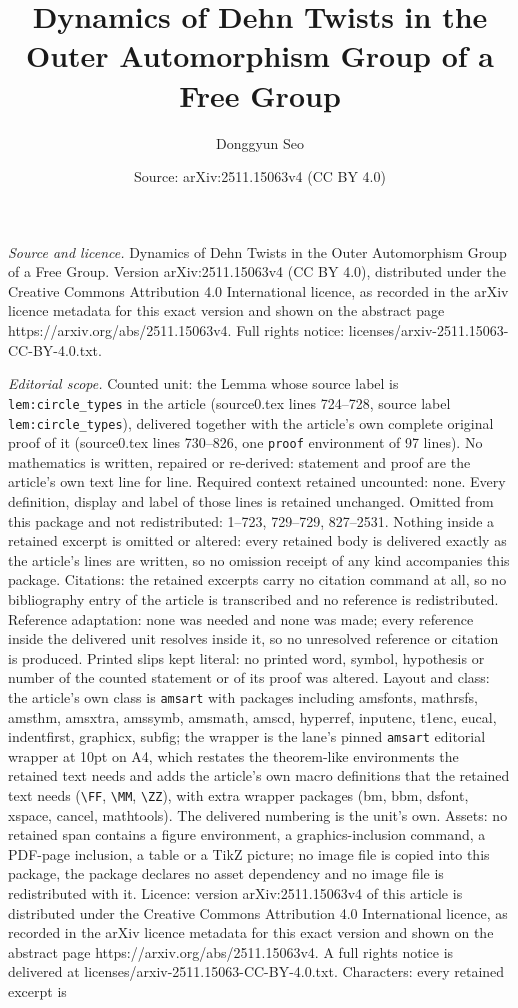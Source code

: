 \documentclass[10pt,a4paper]{amsart}
\title[Dynamics of Dehn Twists in the Outer Automorphism Group of a]{Dynamics of Dehn Twists in the Outer Automorphism Group of a Free Group}
\author{Donggyun Seo}
\date{Source: arXiv:2511.15063v4 (CC BY 4.0)}
\begin{document}
\maketitle

\noindent\emph{Source and licence.} Dynamics of Dehn Twists in the Outer Automorphism Group of a Free Group. Version arXiv:2511.15063v4 (CC BY 4.0), distributed under the Creative Commons Attribution 4.0 International licence, as recorded in the arXiv licence metadata for this exact version and shown on the abstract page https://arxiv.org/abs/2511.15063v4. Full rights notice: licenses/arxiv-2511.15063-CC-BY-4.0.txt.\par\smallskip

\noindent\textit{Editorial scope.} Counted unit: the Lemma whose source label is \texttt{lem:circle\_types} in the article (source0.tex lines 724--728, source label \texttt{lem:circle\_types}), delivered together with the article's own complete original proof of it (source0.tex lines 730--826, one \texttt{proof} environment of 97 lines). No mathematics is written, repaired or re-derived: statement and proof are the article's own text line for line. Required context retained uncounted: none. Every definition, display and label of those lines is retained unchanged. Omitted from this package and not redistributed: 1--723, 729--729, 827--2531. Nothing inside a retained excerpt is omitted or altered: every retained body is delivered exactly as the article's lines are written, so no omission receipt of any kind accompanies this package. Citations: the retained excerpts carry no citation command at all, so no bibliography entry of the article is transcribed and no reference is redistributed. Reference adaptation: none was needed and none was made; every reference inside the delivered unit resolves inside it, so no unresolved reference or citation is produced. Printed slips kept literal: no printed word, symbol, hypothesis or number of the counted statement or of its proof was altered. Layout and class: the article's own class is \texttt{amsart} with packages including amsfonts, mathrsfs, amsthm, amsxtra, amssymb, amsmath, amscd, hyperref, inputenc, t1enc, eucal, indentfirst, graphicx, subfig; the wrapper is the lane's pinned \texttt{amsart} editorial wrapper at 10pt on A4, which restates the theorem-like environments the retained text needs and adds the article's own macro definitions that the retained text needs (\texttt{\textbackslash FF}, \texttt{\textbackslash MM}, \texttt{\textbackslash ZZ}), with extra wrapper packages (bm, bbm, dsfont, xspace, cancel, mathtools). The delivered numbering is the unit's own. Assets: no retained span contains a figure environment, a graphics-inclusion command, a PDF-page inclusion, a table or a TikZ picture; no image file is copied into this package, the package declares no asset dependency and no image file is redistributed with it. Licence: version arXiv:2511.15063v4 of this article is distributed under the Creative Commons Attribution 4.0 International licence, as recorded in the arXiv licence metadata for this exact version and shown on the abstract page https://arxiv.org/abs/2511.15063v4. A full rights notice is delivered at licenses/arxiv-2511.15063-CC-BY-4.0.txt. Characters: every retained excerpt is 
\end{document}
